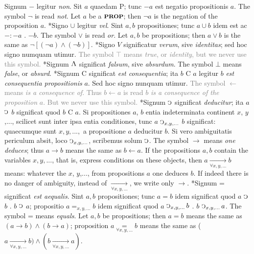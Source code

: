 \documentclass{book}
\newcommand{\C}{\mathop{\sbox0{$\displaystyle$$\reflectbox{C}$} %
\raisebox{-\height+\ht0-0.05cm}[\ht0][\dp0]{\scalebox{0.8}[0.8]{\copy0}}}\displaylimits} %
\newcommand{\abs}{\mathop{\rotatebox[origin=c]{180}{V}}}
\newcommand{\prop}{\mathord{\text{{\footnotesize \textbf{PROP}}}}}
\newcommand\irrelavent[1]{\textcolor{gray}{#1}}
\newenvironment{translateTwoCol}
               { %
                 \columnratio{0.5, 0.5} \begin{paracol}{2}
                 \newcommand{\LAT}{\switchcolumn[0]*}
                 \newcommand{\ENG}{\switchcolumn[1]}
               }
               { %
                 \let\ENG\undefined
                 \let\LAT\undefined
                 \end{paracol}
               }
\begin{document}
\begin{translateTwoCol}
Signum $-$ legitur \emph{non}. Sit $a$ quaedam $\text{P}$; tunc $-a$ est negatio propositionis $a$.
\ENG The symbol $\neg$ is read \emph{not}. Let $a$ be a $\prop$; then $\neg a$ is the negation of the proposition $a$.
\LAT Signo $\cup$ legitur \emph{vel}. Sint $a,b$ propositiones; tunc $a \cup b$ idem est ac $-:-a$ $.$ $-b$.
\ENG The symbol $\vee$ is read \emph{or}. Let $a,b$ be propositions; then $a \vee b$ is the same as $\neg[(\neg a) \wedge (\neg b)]$.
\LAT \text{[}Signo $V$ significatur \emph{verum}, sive \emph{identitas}; sed hoc signo numquam utimur\text{]}.  %
\ENG \irrelavent{The symbol $\top$  means \emph{true}, or \emph{identity}, but we never use this symbol.}
\LAT Signum  $\abs$ significat \emph{falsum}, sive \emph{absurdum}.
\ENG The symbol $\bot$ means \emph{false}, or \emph{absurd}.
\LAT \text{[}Signum C significat \emph{est consequentia}; ita $b$ C $a$ legitur $b$ \emph{est consequentia propositionis} $a$. Sed hoc signo nunquam utimur\text{]}.
\ENG \irrelavent{The symbol $\leftarrow$ means \emph{is a consequence of}. Thus $b \leftarrow a$ is read $b$ \emph{is a consequence of the proposition} $a$. But we never use this symbol.}
\LAT Signum $\C$ significat \emph{deducitur}; ita $a$ $\C$ $b$ significat quod $b$ C $a$. Si propositiones $a$, $b$ entia indeterminata continent $x$, $y$,..., scilicet sunt inter ipsa entia conditiones, tunc $a$ $\C_{x,y,...}$ $b$ significat: quaecumque sunt $x,y,...,$ a propositione $a$ deducitur $b$. Si vero ambiguitatis periculum absit, loco $\C_{x,y,...}$, scribemus solum $\C$.
\ENG The symbol $\rightarrow$ means \emph{one deduces}; thus $a \rightarrow b$ means the same as $b \leftarrow a$. If the propositions $a,b$ contain the variables $x,y,...$, that is, express conditions on these objects, then $a \xrightarrow[\forall x,y,...]{} b$ means: whatever the $x$, $y$,..., from propositions $a$ one deduces $b$. If indeed there is no danger of ambiguity, instead of $\xrightarrow[\forall x,y,...]{}$, we write only $\rightarrow$.
\LAT Signum = significat \emph{est aequalis}. Sint $a,b$ propositiones; tunc $a=b$ idem significat quod $a$ $\C$ $b$ $.$ $b$ $\C$ $a$; propositio $a=_{x,y,...} b$ idem significat quod $a$ $ \C_{x,y,...} b$ $.$ $b$ $\C_{x,y,...} a$.
\ENG The symbol = means \emph{equals}. Let $a,b$ be propositions; then $a=b$ means the same as $(a \rightarrow b) \wedge (b \rightarrow a)$; proposition $a\underset{\forall x,y,...}=b$ means the same as ($a \xrightarrow[\forall x,y,...]{} b) \wedge (b \xrightarrow[\forall x,y,...]{} a)$.
\end{translateTwoCol}
\end{document}
